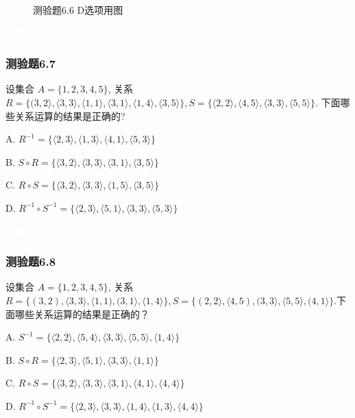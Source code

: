 \documentclass[UTF8, heading=true]{ctexart}
\begin{document}
\begin{figure}[H]
\begin{minipage}[t]{0.23\textwidth}
	      \vspace{-0.3cm}
        \caption{测验题6.6 D选项用图}
\end{minipage}
\end{figure}

\textcolor{white}{答案：AD}



\subsubsection{测验题6.7}

设集合 $A=\{1,2,3,4,5\}$, 关系 $R=\{(3,2\rangle,\langle 3,3\rangle,\langle 1,1\rangle,\langle 3,1\rangle,\langle 1,4\rangle,\langle 3,5\rangle\}, S=\{\langle 2,2\rangle,\langle 4,5\rangle,\langle 3,3\rangle,\langle 5,5\rangle\}$.
下面哪些关系运算的结果是正确的?

A. $R^{-1}=\{\langle 2,3\rangle,\langle 1,3\rangle,\langle 4,1\rangle,\langle 5,3\rangle\}$

B. $S \circ R=\{\langle 3,2\rangle,\langle 3,3\rangle,\langle 3,1\rangle,\langle 3,5\rangle\}$

C. $R \circ S=\{\langle 3,2\rangle,\langle 3,3\rangle,\langle 1,5\rangle,\langle 3,5\rangle\}$

D. 
$R^{-1} \circ S^{-1}=\{\langle 2,3\rangle,\langle 5,1\rangle,\langle 3,3\rangle,\langle 5,3\rangle\}$

\textcolor{white}{答案：D}


\subsubsection{测验题6.8}

设集合 $A=\{1,2,3,4,5\}$, 关系 $R=\{(3,2),\langle 3,3\rangle,\langle 1,1),(3,1\rangle,\langle 1,4\rangle\}, S=\{(2,2\rangle,\langle 4,5),(3,3\rangle,\langle 5,5\rangle,(4,1\rangle\}$.下面哪些关系运算的结果是正确的？

A. $S^{-1}=\{\langle 2,2\rangle,\langle 5,4\rangle,\langle 3,3\rangle,\langle 5,5\rangle,\langle 1,4\rangle\}$

B. ${S \circ R}=\{\langle 2,3\rangle,\langle 5,1\rangle,\langle 3,3\rangle,\langle 1,1\rangle\}$

C. ${R \circ S}=\{\langle 3,2\rangle,\langle 3,3\rangle,\langle 3,1\rangle,\langle 4,1\rangle,\langle 4,4\rangle\}$

D. $R^{-1} \circ S^{-1}=\{\langle 2,3\rangle,\langle 3,3\rangle,\langle 1,4\rangle,\langle 1,3\rangle,\langle 4,4\rangle\}$
\end{document}
